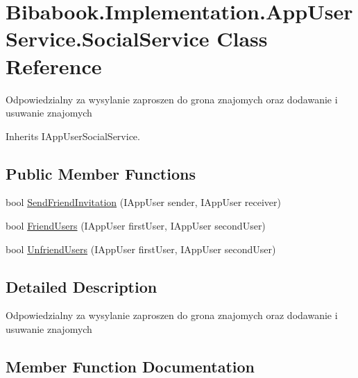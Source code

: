 \hypertarget{class_bibabook_1_1_implementation_1_1_app_user_service_1_1_social_service}{}\section{Bibabook.\+Implementation.\+App\+User\+Service.\+Social\+Service Class Reference}
\label{class_bibabook_1_1_implementation_1_1_app_user_service_1_1_social_service}


Odpowiedzialny za wysylanie zaproszen do grona znajomych oraz dodawanie i usuwanie znajomych  




Inherits I\+App\+User\+Social\+Service.

\subsection*{Public Member Functions}
\begin{DoxyCompactItemize}
\item 
bool \hyperlink{class_bibabook_1_1_implementation_1_1_app_user_service_1_1_social_service_aaf752feeda605c795fce919f89af0cb8}{Send\+Friend\+Invitation} (I\+App\+User sender, I\+App\+User receiver)
\item 
bool \hyperlink{class_bibabook_1_1_implementation_1_1_app_user_service_1_1_social_service_a23fbf1f7de5e49ab135259be820f7f29}{Friend\+Users} (I\+App\+User first\+User, I\+App\+User second\+User)
\item 
bool \hyperlink{class_bibabook_1_1_implementation_1_1_app_user_service_1_1_social_service_a61e408d86571a9571b1130395779eba3}{Unfriend\+Users} (I\+App\+User first\+User, I\+App\+User second\+User)
\end{DoxyCompactItemize}


\subsection{Detailed Description}
Odpowiedzialny za wysylanie zaproszen do grona znajomych oraz dodawanie i usuwanie znajomych 



\subsection{Member Function Documentation}
\hypertarget{class_bibabook_1_1_implementation_1_1_app_user_service_1_1_social_service_a23fbf1f7de5e49ab135259be820f7f29}{}

